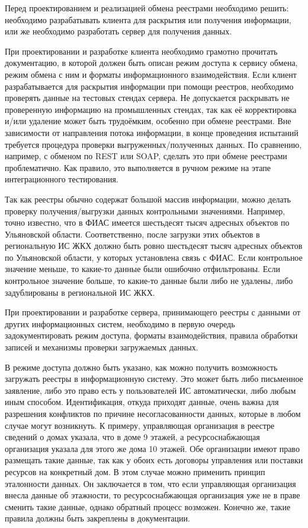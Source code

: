 Перед проектированием и реализацией обмена реестрами необходимо решить: необходимо разрабатывать клиента для раскрытия или получения информации, или же необходимо разработать сервер для получения данных.

При проектировании и разработке клиента необходимо грамотно прочитать документацию, в которой должен быть описан режим доступа к сервису обмена, режим обмена с ним и форматы информационного взаимодействия.
Если клиент разрабатывается для раскрытия информации при помощи реестров, необходимо проверять данные на тестовых стендах сервера.
Не допускается раскрывать не проверенную информацию на промышленных стендах, так как её корректировка и/или удаление может быть трудоёмким, особенно при обмене реестрами.
Вне зависимости от направления потока информации, в конце проведения испытаний требуется процедура проверки выгруженных/полученных данных.
По сравнению, например, с обменом по REST или SOAP, сделать это при обмене реестрами проблематично.
Как правило, это выполняется в ручном режиме на этапе интеграционного тестирования.

Так как реестры обычно содержат большой массив информации, можно делать проверку получения/выгрузки данных контрольными значениями.
Например, точно известно, что в ФИАС имеется шестьдесят тысяч адресных объектов по Ульяновской области.
Соответственно, после загрузки этих объектов в региональную ИС ЖКХ должно быть ровно шестьдесят тысяч адресных объектов по Ульяновской области, у которых установлена связь с ФИАС. Если контрольное значение меньше, то какие-то данные были ошибочно отфильтрованы. Если контрольное значение больше, то какие-то данные были либо не удалены, либо задублированы в региональной ИС ЖКХ.

При проектировании и разработке сервера, принимающего реестры с данными от других информационных систем, необходимо в первую очередь задокументировать режим доступа, форматы взаимодействия, правила обработки записей и механизмы проверки загружаемых данных.

В режиме доступа должно быть указано, как можно получить возможность загружать реестры в информационную систему.
Это может быть либо письменное заявление, либо это право есть у пользователей ИС автоматически, либо любым иным способом.
Идентификация, откуда приходят данные, очень важна для разрешения конфликтов по причине несогласованности данных, которые в любом случае могут возникнуть.
К примеру, управляющая организация в реестре сведений о домах указала, что в доме 9 этажей, а ресурсоснабжающая организация указала для этого же дома 10 этажей.
Обе организации имеют право размещать такие данные, так как у обоих есть договоры управления или поставки ресурсов на конкретный дом.
В этом случае можно применить принцип эталонности данных.
Он заключается в том, что если управляющая организация внесла данные об этажности, то ресурсоснабжающая организация уже не в праве сменить такие данные, однако обратный процесс возможен.
Конечно же, такие правила должны быть закреплены в документации.

